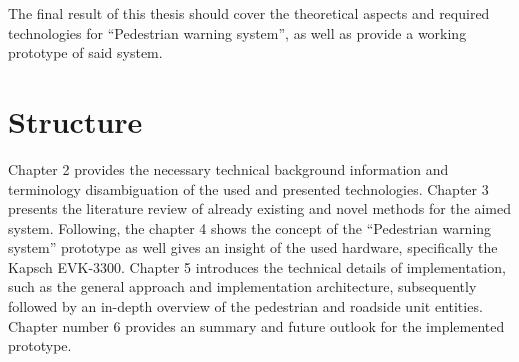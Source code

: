 The final result of this thesis should cover the theoretical aspects and required technologies for ``Pedestrian warning system'', as well as provide a working prototype of said system.


\section{Structure}

Chapter 2 provides the necessary technical background information and terminology disambiguation of the used and presented technologies. Chapter 3 presents the literature review of already existing and novel methods for the aimed system. Following, the chapter 4 shows the concept of the ``Pedestrian warning system'' prototype as well gives an insight of the used hardware, specifically the Kapsch EVK-3300. Chapter 5 introduces the technical details of implementation, such as the general approach and implementation architecture, subsequently followed by an in-depth overview of the pedestrian and roadside unit entities.
Chapter number 6 provides an summary and future outlook for the implemented prototype.






